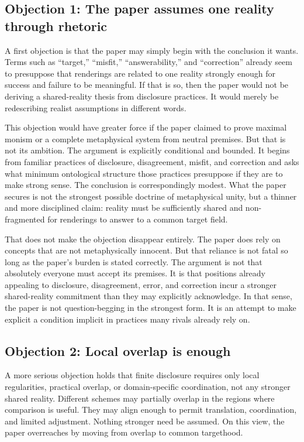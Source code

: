 \documentclass[11pt]{article}
\begin{document}
\subsection{Objection 1: The paper assumes one reality through rhetoric}

A first objection is that the paper may simply begin with the conclusion it wants. Terms such as ``target,'' ``misfit,'' ``answerability,'' and ``correction'' already seem to presuppose that renderings are related to one reality strongly enough for success and failure to be meaningful. If that is so, then the paper would not be deriving a shared-reality thesis from disclosure practices. It would merely be redescribing realist assumptions in different words.

This objection would have greater force if the paper claimed to prove maximal monism or a complete metaphysical system from neutral premises. But that is not its ambition. The argument is explicitly conditional and bounded. It begins from familiar practices of disclosure, disagreement, misfit, and correction and asks what minimum ontological structure those practices presuppose if they are to make strong sense. The conclusion is correspondingly modest. What the paper secures is not the strongest possible doctrine of metaphysical unity, but a thinner and more disciplined claim: reality must be sufficiently shared and non-fragmented for renderings to answer to a common target field.

That does not make the objection disappear entirely. The paper does rely on concepts that are not metaphysically innocent. But that reliance is not fatal so long as the paper's burden is stated correctly. The argument is not that absolutely everyone must accept its premises. It is that positions already appealing to disclosure, disagreement, error, and correction incur a stronger shared-reality commitment than they may explicitly acknowledge. In that sense, the paper is not question-begging in the strongest form. It is an attempt to make explicit a condition implicit in practices many rivals already rely on.

\subsection{Objection 2: Local overlap is enough}

A more serious objection holds that finite disclosure requires only local regularities, practical overlap, or domain-specific coordination, not any stronger shared reality. Different schemes may partially overlap in the regions where comparison is useful. They may align enough to permit translation, coordination, and limited adjustment. Nothing stronger need be assumed. On this view, the paper overreaches by moving from overlap to common targethood.
\end{document}
